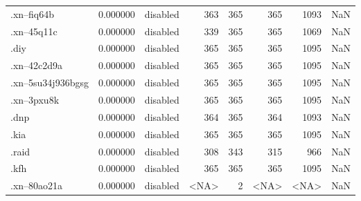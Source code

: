 \begin{tabular}{lrlrrrrl}
.xn--fiq64b               &          0.000000 &        disabled &                         363 &                         365 &                         365 &                1093 &                  NaN \\
.xn--45q11c               &          0.000000 &        disabled &                         339 &                         365 &                         365 &                1069 &                  NaN \\
.diy                      &          0.000000 &        disabled &                         365 &                         365 &                         365 &                1095 &                  NaN \\
.xn--42c2d9a              &          0.000000 &        disabled &                         365 &                         365 &                         365 &                1095 &                  NaN \\
.xn--5su34j936bgsg        &          0.000000 &        disabled &                         365 &                         365 &                         365 &                1095 &                  NaN \\
.xn--3pxu8k               &          0.000000 &        disabled &                         365 &                         365 &                         365 &                1095 &                  NaN \\
.dnp                      &          0.000000 &        disabled &                         364 &                         365 &                         364 &                1093 &                  NaN \\
.kia                      &          0.000000 &        disabled &                         365 &                         365 &                         365 &                1095 &                  NaN \\
.raid                     &          0.000000 &        disabled &                         308 &                         343 &                         315 &                 966 &                  NaN \\
.kfh                      &          0.000000 &        disabled &                         365 &                         365 &                         365 &                1095 &                  NaN \\
.xn--80ao21a              &          0.000000 &        disabled &                        <NA> &                           2 &                        <NA> &                <NA> &                  NaN \\

\end{tabular}
